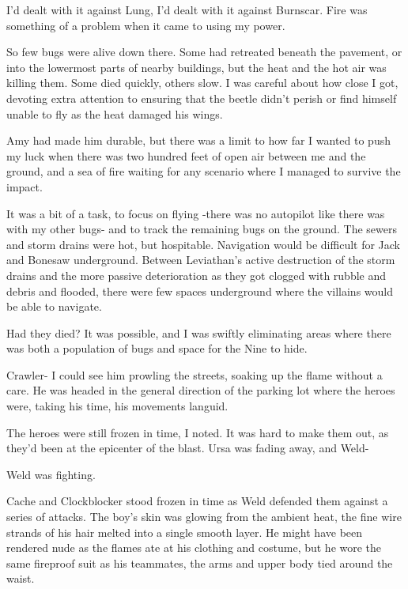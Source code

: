 I'd dealt with it against Lung, I'd dealt with it against Burnscar.  Fire was something of a problem when it came to using my power.



So few bugs were alive down there.  Some had retreated beneath the pavement, or into the lowermost parts of nearby buildings, but the heat and the hot air was killing them.  Some died quickly, others slow.  I was careful about how close I got, devoting extra attention to ensuring that the beetle didn't perish or find himself unable to fly as the heat damaged his wings.



Amy had made him durable, but there was a limit to how far I wanted to push my luck when there was two hundred feet of open air between me and the ground, and a sea of fire waiting for any scenario where I managed to survive the impact.



It was a bit of a task, to focus on flying -there was no autopilot like there was with my other bugs- and to track the remaining bugs on the ground.  The sewers and storm drains were hot, but hospitable.  Navigation would be difficult for Jack and Bonesaw underground.  Between Leviathan's active destruction of the storm drains and the more passive deterioration as they got clogged with rubble and debris and flooded, there were few spaces underground where the villains would be able to navigate.



Had they died?  It was possible, and I was swiftly eliminating areas where there was both a population of bugs and space for the Nine to hide.



Crawler- I could see him prowling the streets, soaking up the flame without a care.  He was headed in the general direction of the parking lot where the heroes were, taking his time, his movements languid.



The heroes were still frozen in time, I noted.  It was hard to make them out, as they'd been at the epicenter of the blast.  Ursa was fading away, and Weld-



Weld was fighting.



Cache and Clockblocker stood frozen in time as Weld defended them against a series of attacks.  The boy's skin was glowing from the ambient heat, the fine wire strands of his hair melted into a single smooth layer.  He might have been rendered nude as the flames ate at his clothing and costume, but he wore the same fireproof suit as his teammates, the arms and upper body tied around the waist.



